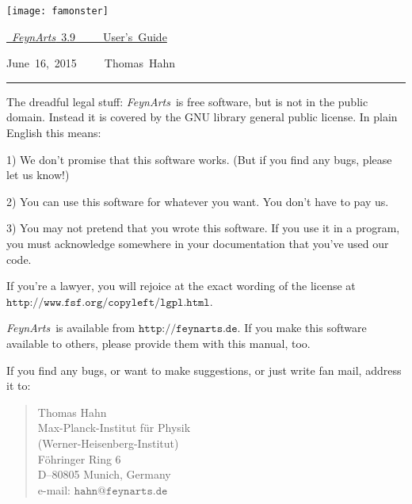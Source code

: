 \documentclass[twoside,12pt]{article}
\def\FA{\textit{FeynArts}}
\def\Code#1{\ensuremath{\texttt{#1}}}
\begin{document}
\thispagestyle{empty}

\vspace*{.2\textheight}

\hfill\texttt{[image: famonster]}

\bigskip\bigskip

\hfill\hbox{\underline{%
\vrule width 0pt height 0pt depth 2ex%
\Huge \FA\ 3.9~~~~~User's Guide}}

\vspace*{1ex}

\hfill\hbox{June 16, 2015~~~~~Thomas Hahn}

\clearpage

\vspace*{.5\textheight}
\vfill

\hrule

\medskip

\begin{scriptsize}
The dreadful legal stuff:
\FA\ is free software, but is not in the public domain.
Instead it is covered by the GNU library general public license.
In plain English this means:

1) We don't promise that this software works.   
(But if you find any bugs, please let us know!)

2) You can use this software for whatever you want.
You don't have to pay us.

3) You may not pretend that you wrote this software.
If you use it in a program, you must acknowledge
somewhere in your documentation that you've used  
our code.

If you're a lawyer, you will rejoice at the exact wording of the license 
at \Code{http://www.fsf.org/copyleft/lgpl.html}.

\FA\ is available from \Code{http://feynarts.de}.  If you make this
software available to others, please provide them with this manual, too.

If you find any bugs, or want to make suggestions, or just write fan mail,
address it to:
\vspace*{-2ex}
\begin{quote}
Thomas Hahn \\
Max-Planck-Institut f\"ur Physik \\
(Werner-Heisenberg-Institut) \\
F\"ohringer Ring 6 \\
D--80805 Munich, Germany \\
e-mail: \Code{hahn@feynarts.de}
\end{quote}
\end{scriptsize}
\end{document}
